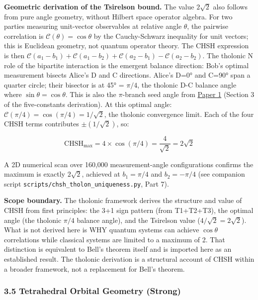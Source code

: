 \documentclass[
  11pt,
  letterpaper,
]{article}
\begin{document}
\textbf{Geometric derivation of the Tsirelson bound.} The value
\(2\sqrt{2}\) also follows from pure angle geometry, without Hilbert
space operator algebra. For two parties measuring unit-vector
observables at relative angle \(\theta\), the pairwise correlation is
\(\mathcal{C}(\theta) = \cos\theta\) by the Cauchy-Schwarz inequality
for unit vectors; this is Euclidean geometry, not quantum operator
theory. The CHSH expression is then
\(\mathcal{C}(a_1-b_1) + \mathcal{C}(a_1-b_2) + \mathcal{C}(a_2-b_1) - \mathcal{C}(a_2-b_2)\).
The tholonic N role of the bipartite interaction is the emergent balance
direction: Bob's optimal measurement bisects Alice's D and C directions.
Alice's D=0° and C=90° span a quarter circle; their bisector is at 45° =
\(\pi/4\), the tholonic D-C balance angle where
\(\sin\theta = \cos\theta\). This is also the \(\pi\)-branch seed angle
from
\href{https://github.com/baardev/truevalue/blob/main/docnav/Research/papers/1_recursive-tholonic-five-constants/1_recursive-tholonic-five-constants.pdf}{Paper
1} (Section 3 of the five-constants derivation). At this optimal angle:
\(\mathcal{C}(\pi/4) = \cos(\pi/4) = 1/\sqrt{2}\), the tholonic
convergence limit. Each of the four CHSH terms contributes
\(\pm(1/\sqrt{2})\), so:

\[\mathrm{CHSH}_{\max} = 4 \times \cos(\pi/4) = \frac{4}{\sqrt{2}} = 2\sqrt{2}\]

A 2D numerical scan over 160,000 measurement-angle configurations
confirms the maximum is exactly \(2\sqrt{2}\), achieved at
\(b_1 = \pi/4\) and \(b_2 = -\pi/4\) (see companion script
\texttt{scripts/chsh\_tholon\_uniqueness.py}, Part 7).

\textbf{Scope boundary.} The tholonic framework derives the structure
and value of CHSH from first principles: the 3+1 sign pattern (from
T1+T2+T3), the optimal angle (the tholonic \(\pi/4\) balance angle), and
the Tsirelson value (\(4/\sqrt{2} = 2\sqrt{2}\)). What is not derived
here is WHY quantum systems can achieve \(\cos\theta\) correlations
while classical systems are limited to a maximum of 2. That distinction
is equivalent to Bell's theorem itself and is imported here as an
established result. The tholonic derivation is a structural account of
CHSH within a broader framework, not a replacement for Bell's theorem.

\subsubsection{3.5 Tetrahedral Orbital Geometry
(Strong)}\label{tetrahedral-orbital-geometry-strong}
\end{document}
